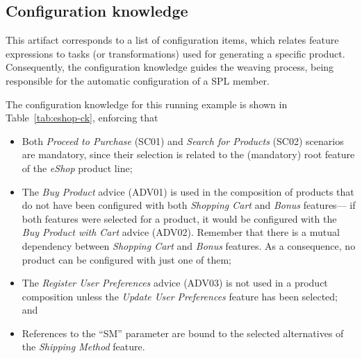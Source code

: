 \subsection{Configuration knowledge}\label{sub:configuration-knowledge}

{\color{red} This artifact corresponds to a list of configuration items, which
relates feature expressions to tasks (or transformations) used for generating a
specific product. Consequently, the configuration knowledge guides the weaving
process, being responsible for the automatic configuration of a SPL member. }

The configuration knowledge for this running example is shown in
Table~\ref{tab:eshop-ck}, enforcing that

\begin{itemize}
\item Both \emph{Proceed to Purchase} (SC01) and \emph{Search for Products}
(SC02) scenarios are mandatory, since their selection is related to the
(mandatory) root feature of the \emph{eShop} product line;

\item The \emph{Buy Product} advice (ADV01) is used in the composition of
products that do not have been configured with both \emph{Shopping Cart} and \emph{Bonus}
features--- if both features were selected for a product, it would be configured
with the \emph{Buy Product with Cart} advice (ADV02). Remember that there is a
mutual dependency between \emph{Shopping Cart} and \emph{Bonus} features. As a
consequence, no product can be configured with just one of them;

\item The \emph{Register User Preferences} advice (ADV03) is not used in a
product composition unless the \emph{Update User Preferences} feature has been
selected; and

\item References to the ``SM'' parameter are bound to the
selected alternatives of the \emph{Shipping Method} feature.

\end{itemize}

